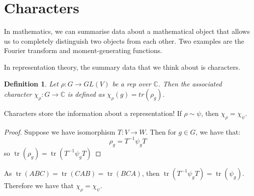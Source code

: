 \documentclass[]{report}
\newtheorem{definition}[theorem]{Definition}
\theoremstyle{definition}
\numberwithin{theorem}{section}
\numberwithin{equation}{section}
\newcommand{\tr}{\operatorname{tr}}
\begin{document}
\section{Characters}
In mathematics, we can summarise data about a mathematical object that allows us to completely distinguish two objects from each other. Two examples are the Fourier transform and moment-generating functions. 

In representation theory, the summary data that we think about is characters.

\begin{definition}
	Let $\rho : G \rightarrow GL(V)$ be a rep over $\mathbb{C}$. Then the associated character $\chi_\rho : G \rightarrow \mathbb{C}$ is defined as $\chi_\rho(g) = tr(\rho_g)$. 
\end{definition}
Characters store the information about a representation!
If $\rho \sim \psi$, then $\chi_\rho = \chi_\psi$. 
\begin{proof}
	Suppose we have isomorphism $T: V \rightarrow W$. Then for $g \in G$, we have that:
	\begin{equation}
		\rho_g = T^{-1} \psi_g T
	\end{equation}
	so $\tr(\rho_g) = \tr(T^{-1} \psi_g T)$
\end{proof}
As $\tr(A B C) = \tr(C A B) = \tr(B C A)$, then $\tr(T^{-1} \psi_g T) = \tr(\psi_g)$. Therefore we have that $\chi_\rho = \chi_\psi$. 
\end{document}
